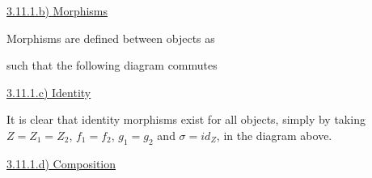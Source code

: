 \vspace{5mm}
\underline{3.11.1.b) Morphisms}

Morphisms are defined between objects as


such that the following diagram commutes



\vspace{5mm}
\underline{3.11.1.c) Identity}

It is clear that identity morphisms exist for all objects, simply by taking $Z = Z_1 = Z_2$, $f_1 = f_2$, $g_1 = g_2$ and $\sigma = id_Z$, in the diagram above.


\vspace{5mm}
\underline{3.11.1.d) Composition}

